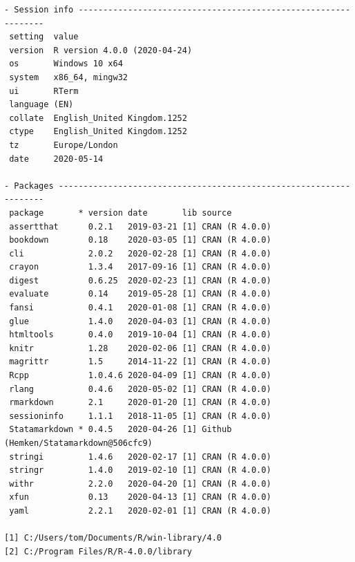 \documentclass[
  10pt,
]{book}
\begin{document}
\begin{verbatim}
- Session info ---------------------------------------------------------------
 setting  value                       
 version  R version 4.0.0 (2020-04-24)
 os       Windows 10 x64              
 system   x86_64, mingw32             
 ui       RTerm                       
 language (EN)                        
 collate  English_United Kingdom.1252 
 ctype    English_United Kingdom.1252 
 tz       Europe/London               
 date     2020-05-14                  

- Packages -------------------------------------------------------------------
 package       * version date       lib source                               
 assertthat      0.2.1   2019-03-21 [1] CRAN (R 4.0.0)                       
 bookdown        0.18    2020-03-05 [1] CRAN (R 4.0.0)                       
 cli             2.0.2   2020-02-28 [1] CRAN (R 4.0.0)                       
 crayon          1.3.4   2017-09-16 [1] CRAN (R 4.0.0)                       
 digest          0.6.25  2020-02-23 [1] CRAN (R 4.0.0)                       
 evaluate        0.14    2019-05-28 [1] CRAN (R 4.0.0)                       
 fansi           0.4.1   2020-01-08 [1] CRAN (R 4.0.0)                       
 glue            1.4.0   2020-04-03 [1] CRAN (R 4.0.0)                       
 htmltools       0.4.0   2019-10-04 [1] CRAN (R 4.0.0)                       
 knitr           1.28    2020-02-06 [1] CRAN (R 4.0.0)                       
 magrittr        1.5     2014-11-22 [1] CRAN (R 4.0.0)                       
 Rcpp            1.0.4.6 2020-04-09 [1] CRAN (R 4.0.0)                       
 rlang           0.4.6   2020-05-02 [1] CRAN (R 4.0.0)                       
 rmarkdown       2.1     2020-01-20 [1] CRAN (R 4.0.0)                       
 sessioninfo     1.1.1   2018-11-05 [1] CRAN (R 4.0.0)                       
 Statamarkdown * 0.4.5   2020-04-26 [1] Github (Hemken/Statamarkdown@506cfc9)
 stringi         1.4.6   2020-02-17 [1] CRAN (R 4.0.0)                       
 stringr         1.4.0   2019-02-10 [1] CRAN (R 4.0.0)                       
 withr           2.2.0   2020-04-20 [1] CRAN (R 4.0.0)                       
 xfun            0.13    2020-04-13 [1] CRAN (R 4.0.0)                       
 yaml            2.2.1   2020-02-01 [1] CRAN (R 4.0.0)                       

[1] C:/Users/tom/Documents/R/win-library/4.0
[2] C:/Program Files/R/R-4.0.0/library
\end{verbatim}

  

\backmatter
\end{document}
